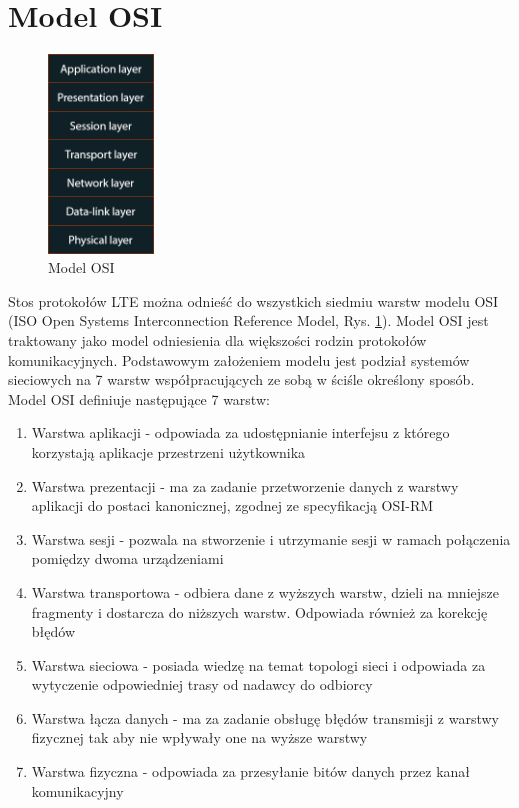 \section{Model OSI}

\begin{figure}
	\centerline{\includegraphics[width=0.25\textwidth]{images/osi.png}}
	\caption{Model OSI}
	\label{fig:osi}
\end{figure}

Stos protokołów LTE można odnieść do wszystkich siedmiu warstw modelu OSI (ISO Open Systems Interconnection Reference Model, Rys. \ref{fig:osi}). Model OSI jest traktowany jako model odniesienia dla większości rodzin protokołów komunikacyjnych. Podstawowym założeniem modelu jest podział systemów sieciowych na 7 warstw współpracujących ze sobą w ściśle określony sposób. \cite{Wiki01} Model OSI definiuje następujące 7 warstw:

\begin{enumerate}
	\item Warstwa aplikacji - odpowiada za udostępnianie interfejsu z którego korzystają aplikacje przestrzeni użytkownika
	\item Warstwa prezentacji - ma za zadanie przetworzenie danych z warstwy aplikacji do postaci kanonicznej, zgodnej ze specyfikacją OSI-RM
	\item Warstwa sesji - pozwala na stworzenie i utrzymanie sesji w ramach połączenia pomiędzy dwoma urządzeniami
	\item Warstwa transportowa - odbiera dane z wyższych warstw, dzieli na mniejsze fragmenty i dostarcza do niższych warstw. Odpowiada również za korekcję błędów
	\item Warstwa sieciowa - posiada wiedzę na temat topologi sieci i odpowiada za wytyczenie odpowiedniej trasy od nadawcy do odbiorcy
	\item Warstwa łącza danych - ma za zadanie obsługę błędów transmisji z warstwy fizycznej tak aby nie wpływały one na wyższe warstwy
	\item Warstwa fizyczna - odpowiada za przesyłanie bitów danych przez kanał komunikacyjny
\end{enumerate}

